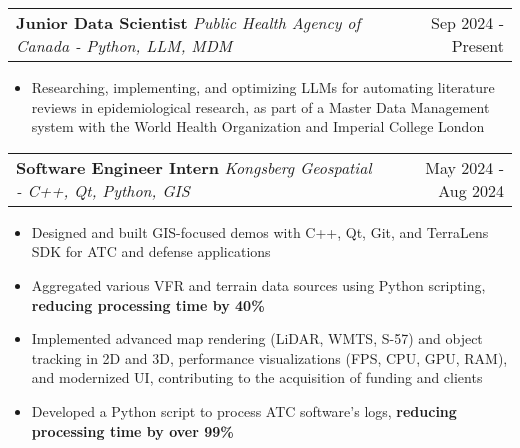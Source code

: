 \documentclass[letterpaper,11pt]{article}
\makeatletter
\newcommand{\resumeItem}[1]{
  \item\small{
    {#1 \vspace{-3pt}}
  }
}
\newcommand{\resumeSubheading}[3]{
    \item
    \begin{tabular*}{0.97\textwidth}[t]{l@{\extracolsep{\fill}}r}
      \textbf{#1} \textbar \textit{ #2} & #3 \\
    \end{tabular*}\vspace{-8.5pt}
}
\newcommand{\resumeItemListStart}{\begin{itemize}}
\newcommand{\resumeItemListEnd}{\end{itemize}\vspace{-5pt}}
\makeatother
\begin{document}
      \resumeSubheading
      {Junior Data Scientist}{Public Health Agency of Canada - Python, LLM, MDM }{Sep 2024 - Present}
      \resumeItemListStart
      \resumeItem{Researching, implementing, and optimizing LLMs for automating literature reviews in epidemiological research, as part of a Master Data Management system with the World Health Organization and Imperial College London}
      \resumeItemListEnd


      \resumeSubheading
      {Software Engineer Intern}{Kongsberg Geospatial - C++, Qt, Python, GIS}{May 2024 - Aug 2024}
      \resumeItemListStart
      \resumeItem{Designed and built GIS-focused demos with C++, Qt, Git, and TerraLens SDK for ATC and defense applications}
      \resumeItem{Aggregated various VFR and terrain data sources using Python scripting, \textbf{reducing processing time by 40\%}}
      \resumeItem{Implemented advanced map rendering (LiDAR, WMTS, S-57) and object tracking in 2D and 3D, performance visualizations (FPS, CPU, GPU, RAM), and modernized UI, contributing to the acquisition of funding and clients}
        \resumeItem{Developed a Python script to process ATC software's logs, \textbf{reducing processing time by over 99\%}}
      \resumeItemListEnd
\end{document}
